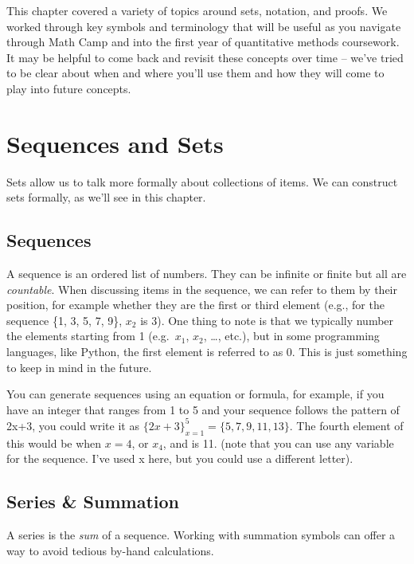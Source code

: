 \documentclass[
]{book}
\begin{document}
This chapter covered a variety of topics around sets, notation, and proofs. We worked through key symbols and terminology that will be useful as you navigate through Math Camp and into the first year of quantitative methods coursework. It may be helpful to come back and revisit these concepts over time -- we've tried to be clear about when and where you'll use them and how they will come to play into future concepts.

\hypertarget{sequences-and-sets}{%
\chapter{Sequences and Sets}\label{sequences-and-sets}}

Sets allow us to talk more formally about collections of items. We can construct sets formally, as we'll see in this chapter.

\hypertarget{sequences}{%
\section{Sequences}\label{sequences}}

A sequence is an ordered list of numbers. They can be infinite or finite but all are \emph{countable}. When discussing items in the sequence, we can refer to them by their position, for example whether they are the first or third element (e.g., for the sequence \{1, 3, 5, 7, 9\}, \(x_2\) is 3). One thing to note is that we typically number the elements starting from 1 (e.g.~\(x_1\), \(x_2\), \ldots, etc.), but in some programming languages, like Python, the first element is referred to as 0. This is just something to keep in mind in the future.

You can generate sequences using an equation or formula, for example, if you have an integer that ranges from 1 to 5 and your sequence follows the pattern of 2x+3, you could write it as \(\{2x+3\}_{x=1}^{5}=\{5, 7, 9, 11, 13 \}\). The fourth element of this would be when \(x=4\), or \(x_4\), and is 11. (note that you can use any variable for the sequence. I've used x here, but you could use a different letter).

\hypertarget{series-summation}{%
\section{Series \& Summation}\label{series-summation}}

A series is the \emph{sum} of a sequence. Working with summation symbols can offer a way to avoid tedious by-hand calculations.
\end{document}
